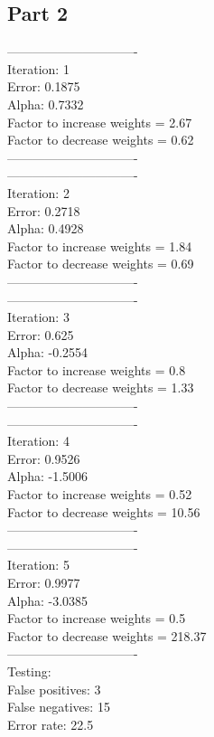 \documentclass[letter]{article}
\theoremstyle{case}
\begin{document}
\subsection*{Part 2}
------------------------------- \\
Iteration:  1 \\
Error: 0.1875 \\
Alpha: 0.7332\\
Factor to increase weights = 2.67 \\
Factor to decrease weights = 0.62 \\
------------------------------- \\
-------------------------------\\
Iteration:  2 \\
Error: 0.2718 \\
Alpha: 0.4928 \\
Factor to increase weights = 1.84 \\
Factor to decrease weights = 0.69\\
-------------------------------\\
-------------------------------\\
Iteration:  3\\
Error: 0.625\\
Alpha: -0.2554\\
Factor to increase weights = 0.8\\
Factor to decrease weights = 1.33\\
-------------------------------\\
-------------------------------\\
Iteration:  4\\
Error: 0.9526\\
Alpha: -1.5006\\
Factor to increase weights = 0.52\\
Factor to decrease weights = 10.56\\
-------------------------------\\
-------------------------------\\
Iteration:  5\\
Error: 0.9977\\
Alpha: -3.0385\\
Factor to increase weights = 0.5\\
Factor to decrease weights = 218.37\\
-------------------------------\\
Testing: \\
False positives: 3\\
False negatives: 15\\
Error rate: 22.5\\
\end{document}
